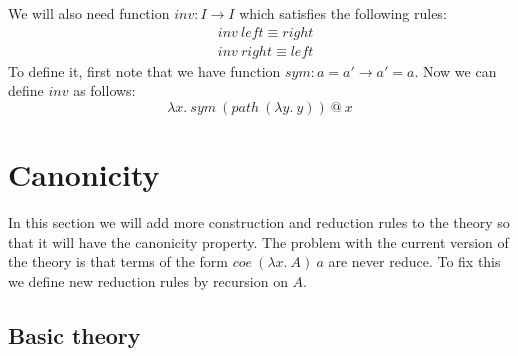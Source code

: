 \documentclass{amsart}
\theoremstyle{definition}
\theoremstyle{remark}
\numberwithin{figure}{section}
\begin{document}
We will also need function $inv : I \to I$ which satisfies the following rules:
\begin{align*}
& inv\ left \equiv right \\
& inv\ right \equiv left
\end{align*}
To define it, first note that we have function $sym : a = a' \to a' = a$.
Now we can define $inv$ as follows:
\[ \lambda x.\ sym\ (path\ (\lambda y.\ y))\ @\ x \]

\section{Canonicity}

In this section we will add more construction and reduction rules to the theory so that it will have the canonicity property.
The problem with the current version of the theory is that terms of the form $coe\ (\lambda x.\ A)\ a$ are never reduce.
To fix this we define new reduction rules by recursion on $A$.

\subsection{Basic theory}
\end{document}
